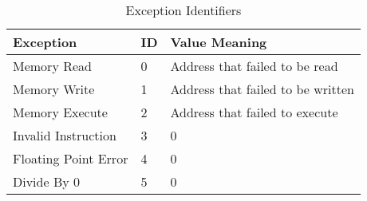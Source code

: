 \begin{table}[H]
\centering
\caption{Exception Identifiers}
{
\tabulinesep=1mm
\begin{tabu} spread 0pt{ X[1.5r]  X[-2c]  X[2l] }
Exception & ID & Value Meaning \\
\hline
Memory Read & 0 & Address that failed to be read \\
Memory Write & 1 & Address that failed to be written \\
Memory Execute & 2 & Address that failed to execute \\
Invalid Instruction & 3 & 0 \\
Floating Point Error & 4 & 0 \\
Divide By 0 & 5 & 0 \\
\end{tabu}
}
\end{table}